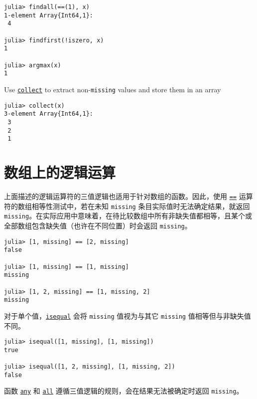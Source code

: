 \begin{verbatim}
julia> findall(==(1), x)
1-element Array{Int64,1}:
 4

julia> findfirst(!iszero, x)
1

julia> argmax(x)
1
\end{verbatim}



Use \hyperlink{6278865767444641812}{\texttt{collect}} to extract non-\texttt{missing} values and store them in an array




\begin{verbatim}
julia> collect(x)
3-element Array{Int64,1}:
 3
 2
 1
\end{verbatim}



\hypertarget{15378768208982642165}{}


\section{数组上的逻辑运算}



上面描述的逻辑运算符的三值逻辑也适用于针对数组的函数。因此，使用 \hyperlink{15143149452920304570}{\texttt{==}} 运算符的数组相等性测试中，若在未知 \texttt{missing} 条目实际值时无法确定结果，就返回 \texttt{missing}。在实际应用中意味着，在待比较数组中所有非缺失值都相等，且某个或全部数组包含缺失值（也许在不同位置）时会返回 \texttt{missing}。




\begin{verbatim}
julia> [1, missing] == [2, missing]
false

julia> [1, missing] == [1, missing]
missing

julia> [1, 2, missing] == [1, missing, 2]
missing
\end{verbatim}



对于单个值，\hyperlink{269533589463185031}{\texttt{isequal}} 会将 \texttt{missing} 值视为与其它 \texttt{missing} 值相等但与非缺失值不同。




\begin{verbatim}
julia> isequal([1, missing], [1, missing])
true

julia> isequal([1, 2, missing], [1, missing, 2])
false
\end{verbatim}



函数 \hyperlink{14612039032155203548}{\texttt{any}} 和 \hyperlink{7942004983516218646}{\texttt{all}} 遵循三值逻辑的规则，会在结果无法被确定时返回 \texttt{missing}。




